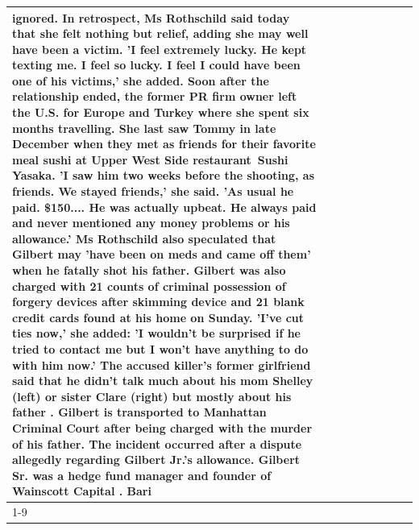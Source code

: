 \begin{table}[H]
\begin{tabular}{lllrlllll}
ignored. In retrospect, Ms Rothschild said today that she felt nothing but relief, adding she may well have been a victim. 'I feel extremely lucky. He kept texting me. I feel so lucky. I feel I could have been one of his victims,' she added. Soon after the relationship ended, the former PR firm owner left the U.S. for Europe and Turkey where she spent six months  travelling. She last saw Tommy in late December when they met as friends for their favorite meal sushi at Upper West Side restaurant Sushi Yasaka. 'I saw him two weeks before the shooting, as friends. We stayed friends,' she said. 'As usual he paid. \$150.... He was actually upbeat. He always paid and never mentioned any money problems or his allowance.' Ms Rothschild also speculated that Gilbert may 'have been on meds and came off them' when he fatally shot his father. Gilbert was also charged with 21 counts of criminal possession of forgery devices after skimming device and 21 blank credit cards found at his home on Sunday. 'I've cut ties now,' she added: 'I wouldn’t be surprised if he tried to contact me but I won’t have anything to do with him now.' The accused killer's former girlfriend said that he didn't talk much about his mom Shelley (left) or sister Clare (right) but mostly about his father . Gilbert is transported to Manhattan Criminal Court  after being charged with the murder of his father. The incident occurred after a dispute allegedly regarding Gilbert Jr.'s allowance. Gilbert Sr. was a hedge fund manager and founder of Wainscott Capital . Bari \\
\cline{1-9}

\end{tabular}
\end{table}
